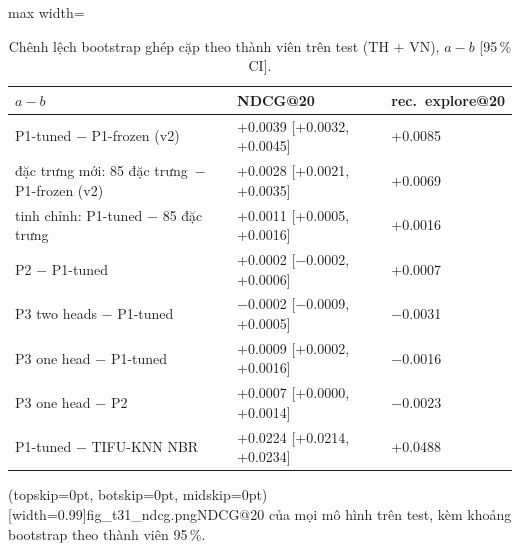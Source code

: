 \documentclass[jtehm]{ieeeaccess}
\begin{document}
\begin{table}[t]
\caption{Chênh lệch bootstrap ghép cặp theo thành viên trên test (TH + VN), $a - b$ [95\,\% CI].}
\label{tab:paired}
\setlength{\tabcolsep}{3pt}
\centering
\begin{adjustbox}{max width=\columnwidth}
\begin{tabular}{lll}
\toprule
$a - b$ & NDCG@20 & rec.\ explore@20 \\
\midrule
P1-tuned $-$ P1-frozen (v2) & +0.0039 [+0.0032, +0.0045] & +0.0085 \\
\quad đặc trưng mới: 85 đặc trưng\ $-$ P1-frozen (v2) & +0.0028 [+0.0021, +0.0035] & +0.0069 \\
\quad tinh chỉnh: P1-tuned $-$ 85 đặc trưng          & +0.0011 [+0.0005, +0.0016] & +0.0016 \\
P2 $-$ P1-tuned             & +0.0002 [$-$0.0002, +0.0006] & +0.0007 \\
P3 two heads $-$ P1-tuned   & $-$0.0002 [$-$0.0009, +0.0005] & $-$0.0031 \\
P3 one head $-$ P1-tuned    & +0.0009 [+0.0002, +0.0016] & $-$0.0016 \\
P3 one head $-$ P2          & +0.0007 [+0.0000, +0.0014] & $-$0.0023 \\
P1-tuned $-$ TIFU-KNN NBR   & +0.0224 [+0.0214, +0.0234] & +0.0488 \\
\bottomrule
\end{tabular}
\end{adjustbox}
\end{table}

\Figure[t!](topskip=0pt, botskip=0pt, midskip=0pt)[width=0.99\columnwidth]{fig_t31_ndcg.png}{NDCG@20 của mọi mô hình trên test, kèm khoảng bootstrap theo thành viên 95\,\%.\label{fig:t31}}
\end{document}
